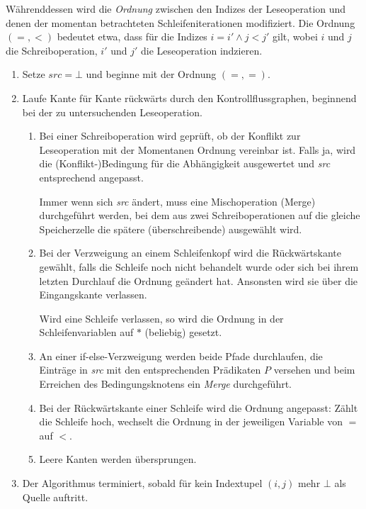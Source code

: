 Währenddessen wird die \textit{Ordnung} zwischen den Indizes der Leseoperation und denen der momentan betrachteten Schleifeniterationen modifiziert. Die Ordnung $(=,<)$ bedeutet etwa, dass für die Indizes $i=i'\wedge j<j'$ gilt, wobei $i$ und $j$ die Schreiboperation, $i'$ und $j'$ die Leseoperation indzieren.
\begin{enumerate}
    \item Setze $\mathit{src}={\bot}$ und beginne mit der Ordnung $(=,=)$.
    \item Laufe Kante für Kante rückwärts durch den Kontrollflussgraphen, beginnend bei der zu untersuchenden Leseoperation.
        \begin{enumerate}
            \item Bei einer Schreiboperation wird geprüft, ob der Konflikt zur Leseoperation mit der Momentanen Ordnung vereinbar ist. Falls ja, wird die (Konflikt-)Bedingung für die Abhängigkeit ausgewertet und \textit{src} entsprechend angepasst.

                Immer wenn sich \textit{src} ändert, muss eine Mischoperation (Merge) durchgeführt werden, bei dem aus zwei Schreiboperationen auf die gleiche Speicherzelle die spätere (überschreibende) ausgewählt wird.
            \item Bei der Verzweigung an einem Schleifenkopf wird die Rückwärtskante gewählt, falls die Schleife noch nicht behandelt wurde oder sich bei ihrem letzten Durchlauf die Ordnung geändert hat. Ansonsten wird sie über die Eingangskante verlassen.

                Wird eine Schleife verlassen, so wird die Ordnung in der Schleifenvariablen auf $*$ (beliebig) gesetzt.
            \item An einer if-else-Verzweigung werden beide Pfade durchlaufen, die Einträge in \textit{src} mit
                den entsprechenden Prädikaten $P$ versehen und beim Erreichen des Bedingungsknotens ein \textit{Merge} durchgeführt.
            \item Bei der Rückwärtskante einer Schleife wird die Ordnung angepasst: Zählt die Schleife hoch, wechselt die Ordnung in der jeweiligen Variable von $=$ auf $<$.
            \item Leere Kanten werden übersprungen.
        \end{enumerate}
    \item Der Algorithmus terminiert, sobald für kein Indextupel $(i,j)$ mehr $\bot$ als Quelle auftritt.
\end{enumerate}


